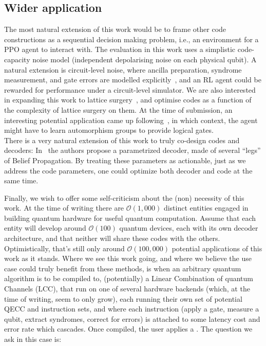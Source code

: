 \subsection{Wider application}
The most natural extension of this work would be to frame other code constructions as a sequential decision making problem, i.e., an environment for a PPO agent to interact with.
The evaluation in this work uses a simplistic code-capacity noise model (independent depolarising noise on each physical qubit). 
A natural extension is circuit-level noise, where ancilla preparation, syndrome measurement, and gate errors are modelled explicitly~\cite{fowler2012surface}, and an RL agent could be rewarded for performance under a circuit-level simulator. 
We are also interested in expanding this work to lattice surgery~\cite{litinski2019game}, and optimise codes as a function of the complexity of lattice surgery on them.
At the time of submission, an interesting potential application came up following~\cite{manjunath2026universal}, in which context, the agent might have to learn automorphism groups to provide logical gates.\\
\noindent There is a very natural extension of this work to truly co-design codes and decoders: 
In~\cite{muller2025improved} the authors propose a parametrized decoder, made of several ``legs'' of Belief Propagation. By treating these parameters as actionable, just as we address the code parameters, one could optimize both decoder and code at the same time.


\noindent Finally, we wish to offer some self-criticism about the (non) necessity of this work. 
At the time of writing there are \(\mathcal{O}(1,000)\) distinct entities engaged in building quantum hardware for useful quantum computation. 
Assume that each entity will develop around \(\mathcal{O}(100)\) quantum devices, each with its own decoder architecture, 
and that neither will share these codes with the others. 
Optimistically, that's still only around \(\mathcal{O}(100,000)\) potential applications of this work as it stands.
Where we see this work going, and where we believe the use case could truly benefit from these methods, is when an arbitrary quantum algorithm is to be compiled to, 
(potentially) a Linear Combination of quantum Channels (LCC), that run on one of several hardware backends 
(which, at the time of writing, seem to only grow), 
each running their own set of potential QECC and instruction sets, 
and where each instruction (apply a gate, measure a qubit, extract syndromes, correct for errors) 
is attached to some latency cost and error rate which cascades. 
Once compiled, the user applies a . The question we ask in this case is:\\


